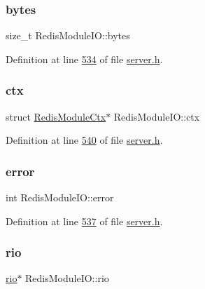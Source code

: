 \subsubsection{\texorpdfstring{bytes}{bytes}}
{\footnotesize\ttfamily size\+\_\+t Redis\+Module\+I\+O\+::bytes}



Definition at line \hyperlink{server_8h_source_l00534}{534} of file \hyperlink{server_8h_source}{server.\+h}.

\mbox{\label{structRedisModuleIO_afd3a53e1503fcfc794573a3ebcddc83c}} 
\subsubsection{\texorpdfstring{ctx}{ctx}}
{\footnotesize\ttfamily struct \hyperlink{structRedisModuleCtx}{Redis\+Module\+Ctx}$\ast$ Redis\+Module\+I\+O\+::ctx}



Definition at line \hyperlink{server_8h_source_l00540}{540} of file \hyperlink{server_8h_source}{server.\+h}.

\mbox{\label{structRedisModuleIO_adfb3643a332a0a6b2811b44eba1c5c6d}} 
\subsubsection{\texorpdfstring{error}{error}}
{\footnotesize\ttfamily int Redis\+Module\+I\+O\+::error}



Definition at line \hyperlink{server_8h_source_l00537}{537} of file \hyperlink{server_8h_source}{server.\+h}.

\mbox{\label{structRedisModuleIO_a8133d961a0c54b069bf0b86d7a5eed33}} 
\subsubsection{\texorpdfstring{rio}{rio}}
{\footnotesize\ttfamily \hyperlink{struct__rio}{rio}$\ast$ Redis\+Module\+I\+O\+::rio}



